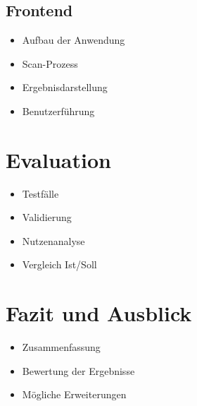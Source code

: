 \documentclass[a4paper,12pt]{scrartcl}
\begin{document}
\subsection{Frontend}
\begin{itemize}
  \item Aufbau der Anwendung
  \item Scan-Prozess
  \item Ergebnisdarstellung
  \item Benutzerführung
\end{itemize}
\section{Evaluation}
\begin{itemize}
  \item Testfälle
  \item Validierung
  \item Nutzenanalyse
  \item Vergleich Ist/Soll
\end{itemize}
\section{Fazit und Ausblick}
\begin{itemize}
  \item Zusammenfassung
  \item Bewertung der Ergebnisse
  \item Mögliche Erweiterungen
\end{itemize}
\printbibliography
\end{document}
